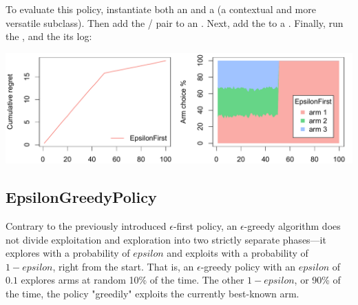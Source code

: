 \documentclass{jss}
\begin{document}
To evaluate this policy, instantiate both an  and a  (a contextual and more versatile  subclass). Then add the / pair to an . Next, add the  to a . Finally, run the , and  the its  log:

\includegraphics[width=\textwidth]{fig/section_5_2}

\subsection{EpsilonGreedyPolicy} \label{epsgreedy}

Contrary to the previously introduced $\epsilon$-first policy, an $\epsilon$-greedy algorithm \citep{Sutton1998e} does not divide exploitation and exploration into two strictly separate phases---it explores with a probability of $epsilon$ and exploits with a probability of $1-epsilon$, right from the start. That is, an $\epsilon$-greedy policy with an $epsilon$ of $0.1$ explores arms at random 10\% of the time. The other $1-epsilon$, or 90\% of the time, the policy "greedily" exploits the currently best-known arm.
\end{document}
